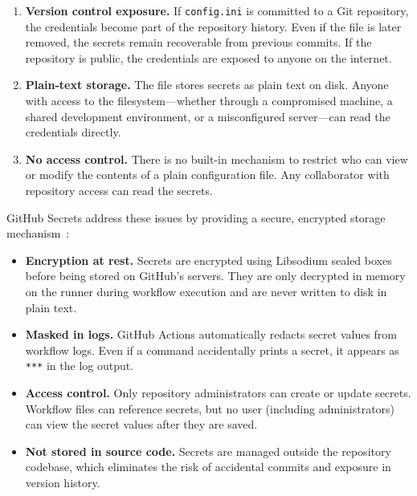 \documentclass[11pt]{article}
\begin{document}
\begin{enumerate}
  \item \textbf{Version control exposure.}
    If \texttt{config.ini} is committed to a Git repository, the credentials become part of the repository history.
    Even if the file is later removed, the secrets remain recoverable from previous commits.
    If the repository is public, the credentials are exposed to anyone on the internet.

  \item \textbf{Plain-text storage.}
    The file stores secrets as plain text on disk.
    Anyone with access to the filesystem---whether through a compromised machine, a shared development environment, or a misconfigured server---can read the credentials directly.

  \item \textbf{No access control.}
    There is no built-in mechanism to restrict who can view or modify the contents of a plain configuration file.
    Any collaborator with repository access can read the secrets.
\end{enumerate}

GitHub Secrets address these issues by providing a secure, encrypted storage mechanism~\cite{github-actions-docs}:

\begin{itemize}
  \item \textbf{Encryption at rest.}
    Secrets are encrypted using Libsodium sealed boxes before being stored on GitHub's servers.
    They are only decrypted in memory on the runner during workflow execution and are never written to disk in plain text.

  \item \textbf{Masked in logs.}
    GitHub Actions automatically redacts secret values from workflow logs.
    Even if a command accidentally prints a secret, it appears as \texttt{***} in the log output.

  \item \textbf{Access control.}
    Only repository administrators can create or update secrets.
    Workflow files can reference secrets, but no user (including administrators) can view the secret values after they are saved.

  \item \textbf{Not stored in source code.}
    Secrets are managed outside the repository codebase, which eliminates the risk of accidental commits and exposure in version history.
\end{itemize}
\end{document}
